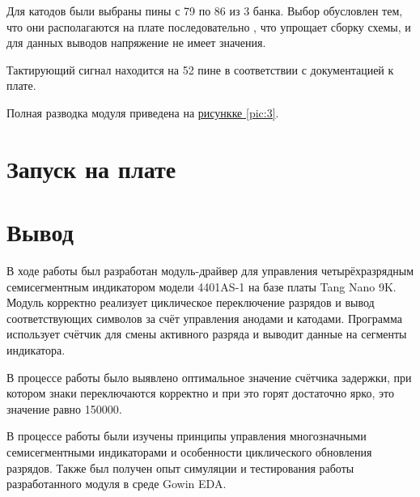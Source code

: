 Для катодов были выбраны пины с 79 по 86 из 3 банка. Выбор обусловлен тем, что они располагаются на плате последовательно , что упрощает сборку схемы, и для данных выводов напряжение не имеет значения.


Тактирующий сигнал находится на 52 пине в соответствии с документацией к плате.

\newpage

Полная разводка модуля приведена на \hyperref[pic:3]{рисункке \ref*{pic:3}}.


\section{Запуск на плате}



\newpage
\section*{Вывод}

В ходе работы был разработан модуль-драйвер для управления четырёхразрядным семисегментным индикатором модели 4401AS-1 на базе платы Tang Nano 9K. Модуль корректно реализует циклическое переключение разрядов и вывод соответствующих символов за счёт управления анодами и катодами. Программа использует счётчик для смены активного разряда и выводит данные на сегменты индикатора.

В процессе работы было выявлено оптимальное значение счётчика задержки, при котором знаки переключаются корректно и при это горят достаточно ярко, это значение равно 150000.

В процессе работы были изучены принципы управления многозначными семисегментными индикаторами и особенности циклического обновления разрядов. Также был получен опыт симуляции и тестирования работы разработанного модуля в среде Gowin EDA.
